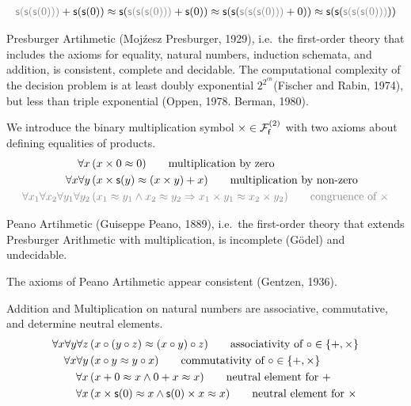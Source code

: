 \begin{example}
	\begin{gather*}
	{\colG \msucc(\msucc(\msucc(0)))} + \msucc(\msucc(0))
	\mEQ\msucc({\colG \msucc(\msucc(\msucc(0)))} + \msucc(0)) 
	\mEQ \msucc(\msucc(
	{\colG \msucc(\msucc(\msucc(0)))} + 0))
	\mEQ \msucc(\msucc(
	{\colG \msucc(\msucc(\msucc(0)))}))
	\end{gather*}
	\end{example}

\begin{theorem}Presburger Artihmetic (Moj\'{z}esz Presburger, 1929), i.e.~the first-order theory that includes the axioms for equality, natural numbers, induction schemata, and addition, is consistent, complete and decidable. The computational complexity of the decision problem is at least doubly exponential $2^{2^{cn}}$(Fischer and Rabin, 1974), but less than triple exponential (Oppen, 1978. Berman, 1980).
\end{theorem}

\begin{definition}
	[Multiplikation]
	\label{tab:addition:axioms}
	We introduce the binary multiplication symbol $\times\in\mcFfn[2]$
	with two axioms about defining equalities of products.
	\begin{align*}
	\forall x\,
	&(x\times 0 \mEQ 0) 
	\tag*{multiplication by zero}\\
	\forall x\forall y\,
	&(x\times\msucc(y) \mEQ (x\times y) + x)
	\tag*{multiplication by non-zero}
	\\
	\colG\forall x_1\forall x_2\forall y_1\forall y_2\,
	&\colG (x_1\mEQ y_1\land x_2\mEQ y_2 \limp x_1\times y_1\mEQ x_2 \times y_2)
	\tag*{congruence of $\times$}
	\end{align*}
\end{definition}

\begin{theorem}Peano Artihmetic (Guiseppe Peano, 1889), 
	i.e.~the first-order theory that extends Presburger Arithmetic with multiplication, is incomplete (Gödel) and undecidable. 
\end{theorem}

\begin{theorem}
	The axioms of Peano Artihmetic appear consistent (Gentzen, 1936).
\end{theorem}

\begin{lemma}[ACN]\label{lem:acn}
	Addition and Multiplication on natural numbers are associative, commutative, 
	and determine neutral elements.
	\begin{align*}
	\forall x\forall y\forall z\,&(x\circ(y\circ z) \mEQ (x\circ y)\circ z) 
	\tag*{associativity of $\circ\in\{+,\times\}$}
	\\
	\forall x\forall y\,&(x\circ y \mEQ y\circ x)
	\tag*{commutativity of $\circ\in\{+,\times\}$}
	\\
	\forall x\,&(x + 0\mEQ x \land 0 + x \mEQ x )
	\tag*{neutral element for $+$}
	\\
	\forall x\,&(x \times \msucc(0)\mEQ x \land \msucc(0) \times x \mEQ x )
	\tag*{neutral element for $\times$}
	\end{align*}
\end{lemma}

